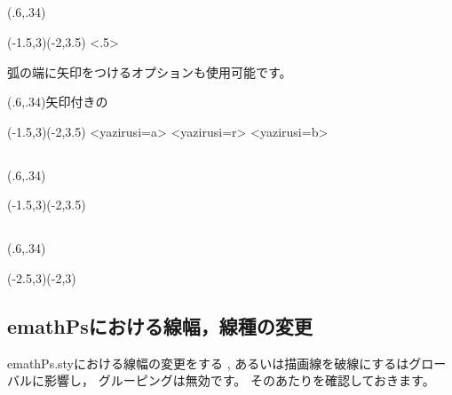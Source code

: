 \documentclass[a4j]{jarticle}
\begin{document}
\subsection{\texorpdfstring{}{HenKo}}
\begin{showEx}(.6,.34){}
\begin{pszahyou}[ul=6mm](-1.5,3)(-2,3.5)%
  \Takakkei{\A\B\C\D}
  \HenKo\A{}
  \HenKo[20]<.5>\B{}
\end{pszahyou}
\end{showEx}

弧の端に矢印をつけるオプションも使用可能です。

\begin{showEx}(.6,.34){矢印付きの}
\begin{pszahyou}[ul=6mm](-1.5,3)(-2,3.5)%
  \Takakkei{\A\B\C\D}
  \HenKo<yazirusi=a>\A{}
  \HenKo[20]<yazirusi=r>\B{}
  \HenKo[20]<yazirusi=b>\C{}
\end{pszahyou}
\end{showEx}

\subsection{\texorpdfstring{}{Kakukigou}}
\begin{showEx}(.6,.34){}
\begin{pszahyou*}[ul=6mm](-1.5,3)(-2,3.5)%
  \Kakukigou\B\A\C{$\theta$}
  \Drawline{\B\A\C}
\end{pszahyou*}
\end{showEx}

\subsection{\texorpdfstring{}{Tyokkakukigou}}
\begin{showEx}(.6,.34){}
\begin{pszahyou*}[ul=6mm](-2.5,3)(-2,3)%
  \Tyokkakukigou\B\A\C
  \Drawline{\B\A\C}
\end{pszahyou*}
\end{showEx}

\subsection{\textsf{emathPs}における線幅，線種の変更}
\textsf{emathPs.sty}における線幅の変更をする , 
あるいは描画線を破線にするはグローバルに影響し，
グルーピングは無効です。
そのあたりを確認しておきます。
\end{document}
